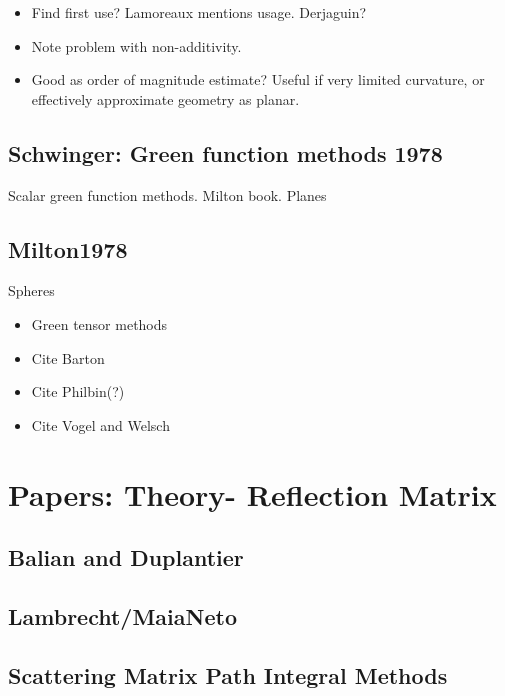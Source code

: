 \begin{itemize}
\item Find first use?  Lamoreaux mentions usage.  Derjaguin?\cite{Derjaguin1956} \cite{Blocki1977}
\item Note problem with non-additivity. 
\item Good as order of magnitude estimate?  Useful if very limited curvature, or effectively approximate geometry as planar.  
\end{itemize}

\subsection{Schwinger: Green function methods 1978}

\cite{Schwinger1978, Milton1978}

Scalar green function methods.  Milton book.  
Planes

\subsection{Milton1978}
Spheres

\begin{itemize}
\item Green tensor methods
\item Cite Barton
\item Cite Philbin(?)
\item Cite Vogel and Welsch
\end{itemize}

\section{Papers: Theory- Reflection Matrix}

\subsection{Balian and Duplantier}
\cite{Balian1977} \cite{Balian1978}
\subsection{Lambrecht/MaiaNeto}

\cite{Lambrecht2006}
\cite{MaiaNeto2008}
\cite{Canaguier-Durand2012}

\subsection{Scattering Matrix Path Integral Methods}


